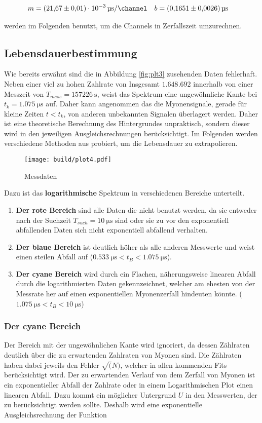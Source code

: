 \begin{align*}
	m&=\qty{21,67(0,01)e-3}{\us\per\channel} & 
	b&=\qty{0,1651(0,0026)}{\us}
\end{align*}

werden im Folgenden benutzt, um die Channels in Zerfallszeit umzurechnen. 

\subsection{Lebensdauerbestimmung}
Wie bereits erwähnt sind die in Abbildung \eqref{fig:plt3} zusehenden Daten fehlerhaft. 
Neben einer viel zu hohen Zahlrate von Insgesamt $1.648.692$ innerhalb von einer Messzeit von $T_{mess}=\qty{157226}{\s}$,
weist das Spektrum eine ungewöhnliche Kante bei $t_k=\qty{1.075}{\us}$ auf.
Daher kann angenommen das die Myonensignale, gerade für kleine Zeiten $t<t_k$, von anderen unbekannten Signalen überlagert werden. 
Daher ist eine theoretische Berechnung des Hintergrundes unpraktisch, sondern dieser wird in den jeweiligen Ausgleichsrechnungen berücksichtigt. 
Im Folgenden werden verschiedene Methoden aus probiert, um die Lebensdauer zu extrapolieren. 
 
\begin{figure}[H]
	\centering
	\texttt{[image: build/plot4.pdf]}
	\caption{Messdaten}\label{fig:plt4}
\end{figure}

Dazu ist das \textbf{logarithmische} Spektrum in verschiedenen Bereiche unterteilt. 

\begin{enumerate}
	\item \textbf{Der rote Bereich} sind alle Daten die nicht benutzt werden, da sie entweder nach der Suchzeit $T_{such}=\qty{10}{\us}$ sind 
	oder sie zu vor den exponentiell abfallenden Daten sich nicht exponentiell abfallend verhalten. 
	\item \textbf{Der blaue Bereich} ist deutlich höher als alle anderen Messwerte und weist einen steilen Abfall auf ($\qty{0.533}{\us}<t_B<\qty{1.075}{\us}$).
	\item \textbf{Der cyane Bereich} wird durch ein Flachen, näherungsweise linearen Abfall durch die logarithmierten Daten gekennzeichnet, 
	welcher am ehesten von der Messrate her auf einen exponentiellen Myonenzerfall hindeuten könnte. ($\qty{1.075}{\us}<t_B<\qty{10}{\us}$)
\end{enumerate}

\subsubsection{Der cyane Bereich}
Der Bereich mit der ungewöhnlichen Kante wird ignoriert, da dessen Zählraten deutlich über die zu erwartenden Zahlraten von Myonen sind. 
Die Zählraten haben dabei jeweils den Fehler $\sqrt(N) $, welcher in allen kommenden Fits berücksichtigt wird. 
Der zu erwartenden Verlauf von dem Zerfall von Myonen ist ein exponentieller Abfall der Zahlrate oder in einem Logarithmischen Plot einen linearen Abfall. 
Dazu kommt ein möglicher Untergrund $U$ in den Messwerten, der zu berücksichtigt werden sollte. 
Deshalb wird eine exponentielle Ausgleichsrechnung der Funktion 


